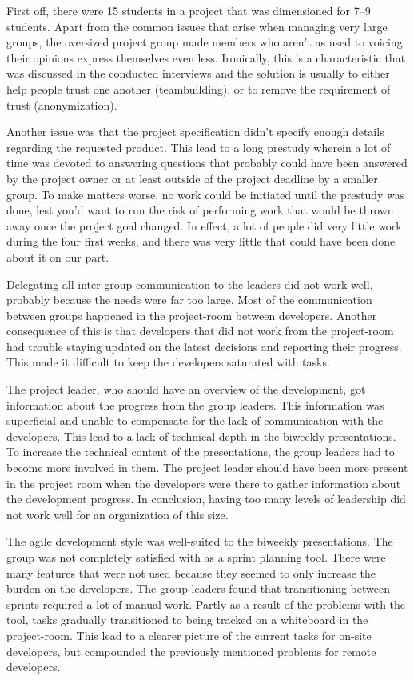 First off, there were 15 students in a project that was dimensioned for 7--9 students. Apart from the common issues that arise when managing very large groups, the oversized project group made members who aren't as used to voicing their opinions express themselves even less. Ironically, this is a characteristic that was discussed in the conducted interviews and the solution is usually to either help people trust one another (teambuilding), or to remove the requirement of trust (anonymization). 

Another issue was that the project specification didn't specify enough details regarding the requested product. This lead to a long prestudy wherein a lot of time was devoted to answering questions that probably could have been answered by the project owner or at least outside of the project deadline by a smaller group. To make matters worse, no work could be initiated until the prestudy was done, lest you'd want to run the risk of performing work that would be thrown away once the project goal changed. In effect, a lot of people did very little work during the four first weeks, and there was very little that could have been done about it on our part.

Delegating all inter-group communication to the leaders did not work well, probably because the needs were far too large. Most of the communication between groups happened in the project-room between developers. Another consequence of this is that developers that did not work from the project-room had trouble staying updated on the latest decisions and reporting their progress. This made it difficult to keep the developers saturated with tasks.

The project leader, who should have an overview of the development, got information about the progress from the group leaders. This information was superficial and unable to compensate for the lack of communication with the developers. This lead to a lack of technical depth in the biweekly presentations. To increase the technical content of the presentations, the group leaders had to become more involved in them. The project leader should have been more present in the project room when the developers were there to gather information about the development progress. In conclusion, having too many levels of leadership did not work well for an organization of this size.

The agile development style was well-suited to the biweekly presentations. The group was not completely satisfied with \taiga{} as a sprint planning tool. There were many features that were not used because they seemed to only increase the burden on the developers. The group leaders found that transitioning between sprints required a lot of manual work. Partly as a result of the problems with the tool, tasks gradually transitioned to being tracked on a whiteboard in the project-room. This lead to a clearer picture of the current tasks for on-site developers, but compounded the previously mentioned problems for remote developers.

